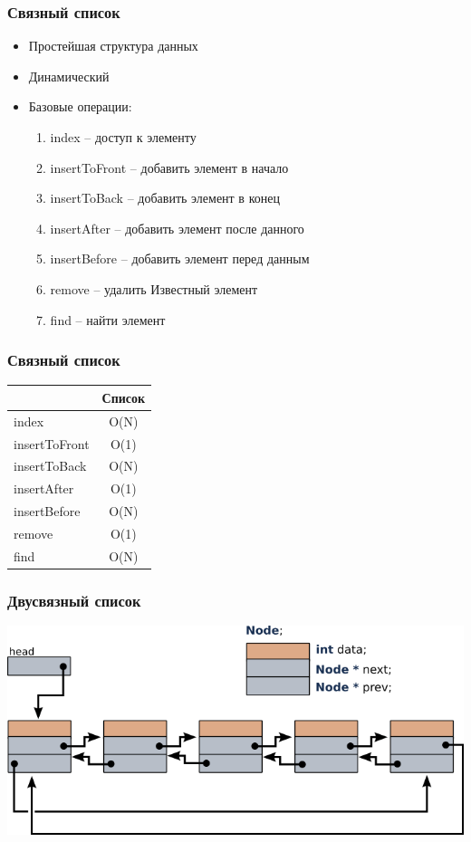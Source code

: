 \documentclass[12pt,pdf,hyperref={unicode}]{beamer}
\begin{document}
\begin{frame}[fragile]
\frametitle{Связный список}
\begin{itemize}
\item Простейшая структура данных \\
\item Динамический \\
\item Базовые операции:
\begin{enumerate}
\item index  --  доступ к элементу
\item insertToFront --  добавить элемент в начало
\item insertToBack --  добавить элемент в конец
\item insertAfter  --  добавить элемент после данного
\item insertBefore  --  добавить элемент перед данным
\item remove --  удалить Известный элемент
\item find   --  найти элемент
\end{enumerate}
\end{itemize}
\end{frame}


\begin{frame}[fragile]
\frametitle{Связный список}
\begin{center}
  \begin{tabular}{  l | c }
      & Список \\
    \hline
    index & O(N) \\
    insertToFront & O(1)  \\
    insertToBack & O(N)  \\
    insertAfter & O(1)  \\
    insertBefore & O(N)  \\
    remove & O(1) \\
    find & O(N)  \\
    \hline
  \end{tabular}
\end{center}
\end{frame}


\begin{frame}[fragile]
\frametitle{Двусвязный список} 
\begin{center}
\includegraphics[width=0.99\linewidth]{images/2linked_list.png}
\end{center}
\end{frame}
\end{document}
